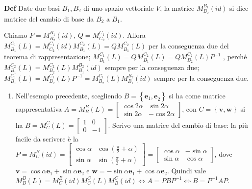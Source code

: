 \documentclass{article}
\begin{document}
\textbf{Def} Date due basi $B_{1},B_{2}$ di uno spazio vettoriale $V$, la
matrice $M_{B_{2}}^{B_{1}}\left( id\right) $ si dice matrice del cambio di
base da $B_{2}$ a $B_{1}$.

Chiamo $P=M_{B_{2}}^{B_{1}}\left( id\right) $, $Q=M_{C_{2}}^{C_{1}}\left(
id\right) $. Allora $M_{B_{1}}^{C_{1}}\left( L\right)
=M_{C_{2}}^{C_{1}}\left( id\right) M_{B_{1}}^{C_{2}}\left( L\right)
=QM_{B_{1}}^{C_{2}}\left( L\right) $ per la conseguenza due del teorema di
rappresentazione; $M_{B_{1}}^{C_{1}}\left( L\right)
=QM_{B_{1}}^{C_{2}}\left( L\right) =QM_{B_{2}}^{C_{2}}\left( L\right) P^{-1}$%
, perch\'{e} $M_{B_{1}}^{C_{2}}\left( L\right) =M_{B_{2}}^{C_{2}}\left(
L\right) M_{B_{1}}^{B_{2}}\left( id\right) $ sempre per la conseguenza due; $%
M_{B_{1}}^{C_{1}}\left( L\right) =M_{B_{2}}^{C_{1}}\left( L\right)
P^{-1}=M_{B_{2}}^{C_{1}}\left( L\right) M_{B_{1}}^{B_{2}}\left( id\right) $
sempre per la conseguenza due.

\begin{enumerate}
\item Nell'esempio precedente, scegliendo $B=\left\{ \mathbf{e}_{1}\mathbf{,e%
}_{2}\right\} $ si ha come matrice rappresentativa $A=M_{B}^{B}\left(
L\right) =\left[ 
\begin{array}{cc}
\cos 2\alpha & \sin 2\alpha \\ 
\sin 2\alpha & -\cos 2\alpha%
\end{array}%
\right] $, con $C=\left\{ \mathbf{v,w}\right\} $ si ha $B=M_{C}^{C}\left(
L\right) =\left[ 
\begin{array}{cc}
1 & 0 \\ 
0 & -1%
\end{array}%
\right] $. Scrivo una matrice del cambio di base: la pi\`{u} facile da
scrivere \`{e} la $P=M_{C}^{B}\left( id\right) =\left[ 
\begin{array}{cc}
\cos \alpha & \cos \left( \frac{\pi }{2}+\alpha \right) \\ 
\sin \alpha & \sin \left( \frac{\pi }{2}+\alpha \right)%
\end{array}%
\right] =\left[ 
\begin{array}{cc}
\cos \alpha & -\sin \alpha \\ 
\sin \alpha & \cos \alpha%
\end{array}%
\right] $, dove $\mathbf{v}=\cos \alpha \mathbf{e}_{1}+\sin \alpha \mathbf{e}%
_{2}$ e $\mathbf{w}=-\sin \alpha \mathbf{e}_{1}+\cos \alpha \mathbf{e}_{2}$.
Quindi vale $M_{B}^{B}\left( L\right) =M_{C}^{B}\left( id\right)
M_{C}^{C}\left( L\right) M_{B}^{C}\left( id\right) \Longleftrightarrow
A=PBP^{-1}\Longleftrightarrow B=P^{-1}AP$.
\end{enumerate}
\end{document}
